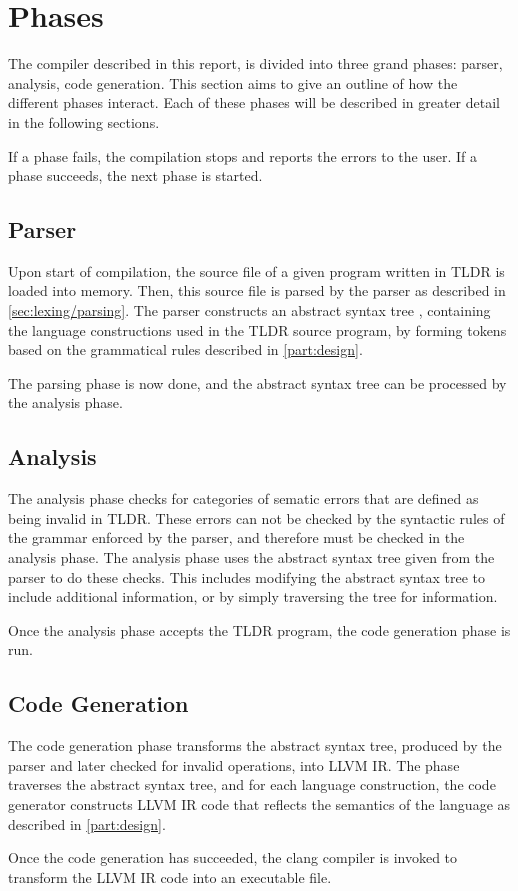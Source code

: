\section{Phases}

The compiler described in this report, is divided into three grand phases: parser, analysis, code generation. This section aims to give an outline of how the different phases interact. Each of these phases will be described in greater detail in the following sections.

If a phase fails, the compilation stops and reports the errors to the user. If a phase succeeds, the next phase is started.

\subsection{Parser}

Upon start of compilation, the source file of a given program written in TLDR is loaded into memory. Then, this source file is parsed by the parser as described in \cref{sec:lexing/parsing}. The parser constructs an abstract syntax tree \cite{fisher}, containing the language constructions used in the TLDR source program, by forming tokens based on the grammatical rules described in \cref{part:design}. 

The parsing phase is now done, and the abstract syntax tree can be processed by the analysis phase.

\subsection{Analysis}

The analysis phase checks for categories of sematic errors that are defined as being invalid in TLDR. These errors can not be checked by the syntactic rules of the grammar enforced by the parser, and therefore must be checked in the analysis phase. The analysis phase uses the abstract syntax tree given from the parser to do these checks. This includes modifying the abstract syntax tree to include additional information, or by simply traversing the tree for information.

Once the analysis phase accepts the TLDR program, the code generation phase is run.

\subsection{Code Generation}

The code generation phase transforms the abstract syntax tree, produced by the parser and later checked for invalid operations, into LLVM IR. The phase traverses the abstract syntax tree, and for each language construction, the code generator constructs LLVM IR code that reflects the semantics of the language as described in \cref{part:design}.

Once the code generation has succeeded, the clang compiler is invoked to transform the LLVM IR code into an executable file.
